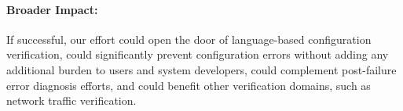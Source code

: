 \paragraph{Broader Impact:} If successful, our effort could open the door of language-based configuration verification, could significantly prevent configuration errors without adding any additional burden to users and system developers, could complement post-failure error diagnosis efforts, and could benefit other verification domains, such as network traffic verification. 

